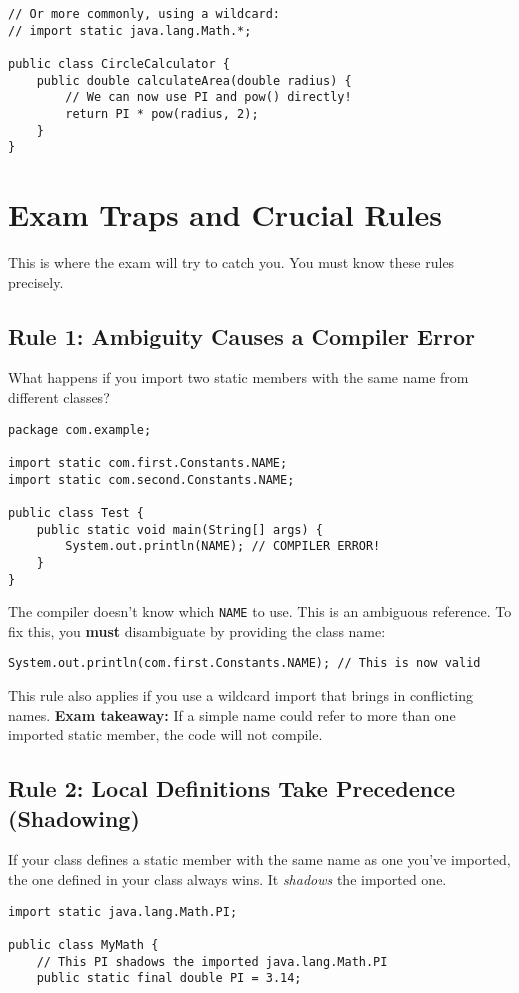 \documentclass[12pt]{article}
\begin{document}
\begin{enumerate}[label=(\arabic*)]
\begin{verbatim}
// Or more commonly, using a wildcard:
// import static java.lang.Math.*;

public class CircleCalculator {
    public double calculateArea(double radius) {
        // We can now use PI and pow() directly!
        return PI * pow(radius, 2);
    }
}
\end{verbatim}

\section{Exam Traps and Crucial Rules}
This is where the exam will try to catch you. You must know these rules precisely.

\subsection{Rule 1: Ambiguity Causes a Compiler Error}
What happens if you import two static members with the same name from different classes?
\begin{verbatim}
package com.example;

import static com.first.Constants.NAME;
import static com.second.Constants.NAME;

public class Test {
    public static void main(String[] args) {
        System.out.println(NAME); // COMPILER ERROR!
    }
}
\end{verbatim}
The compiler doesn't know which \texttt{NAME} to use. This is an ambiguous reference. To fix this, you \textbf{must} disambiguate by providing the class name:
\begin{verbatim}
System.out.println(com.first.Constants.NAME); // This is now valid
\end{verbatim}
This rule also applies if you use a wildcard import that brings in conflicting names. \textbf{Exam takeaway:} If a simple name could refer to more than one imported static member, the code will not compile.

\subsection{Rule 2: Local Definitions Take Precedence (Shadowing)}
If your class defines a static member with the same name as one you've imported, the one defined in your class always wins. It \textit{shadows} the imported one.
\begin{verbatim}
import static java.lang.Math.PI;

public class MyMath {
    // This PI shadows the imported java.lang.Math.PI
    public static final double PI = 3.14;


\end{verbatim}
\end{enumerate}
\end{document}
